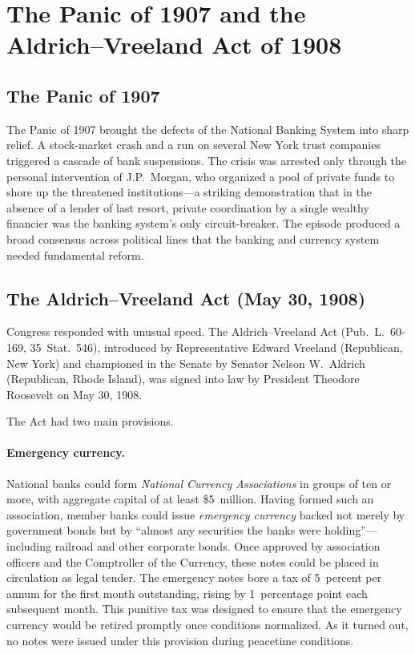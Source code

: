 \documentclass[12pt]{article}
\begin{document}
\section{The Panic of 1907 and the Aldrich--Vreeland Act of 1908}
\label{sec:aldrich-vreeland}

\subsection{The Panic of 1907}

The Panic of 1907 brought the defects of the National Banking System into sharp
relief.  A stock-market crash and a run on several New York trust companies
triggered a cascade of bank suspensions.  The crisis was arrested only through the
personal intervention of J.P.\ Morgan, who organized a pool of private funds to
shore up the threatened institutions---a striking demonstration that in the
absence of a lender of last resort, private coordination by a single wealthy
financier was the banking system's only circuit-breaker.  The episode produced a broad
consensus across political lines that the banking and currency system needed
fundamental reform.

\subsection{The Aldrich--Vreeland Act (May 30, 1908)}

Congress responded with unusual speed.  The Aldrich--Vreeland Act (Pub.\ L.\
60-169, 35~Stat.\ 546), introduced by Representative Edward Vreeland
(Republican, New York) and championed in the Senate by Senator Nelson W.\ Aldrich
(Republican, Rhode Island), was signed into law by President Theodore Roosevelt on
May 30, 1908.

The Act had two main provisions.

\paragraph{Emergency currency.}  National banks could form \emph{National Currency
Associations} in groups of ten or more, with aggregate capital of at least
\$5~million.  Having formed such an association, member banks could issue
\emph{emergency currency} backed not merely by government bonds but by
``almost any securities the banks were holding''---including railroad and other
corporate bonds.  Once approved by association officers and the Comptroller of
the Currency, these notes could be placed in circulation as legal tender.  The
emergency notes bore a tax of 5~percent per annum for the first month outstanding,
rising by 1~percentage point each subsequent month.  This punitive tax was designed
to ensure that the emergency currency would be retired promptly once conditions
normalized.  As it turned out, no notes were issued under this provision during
peacetime conditions.
\end{document}
